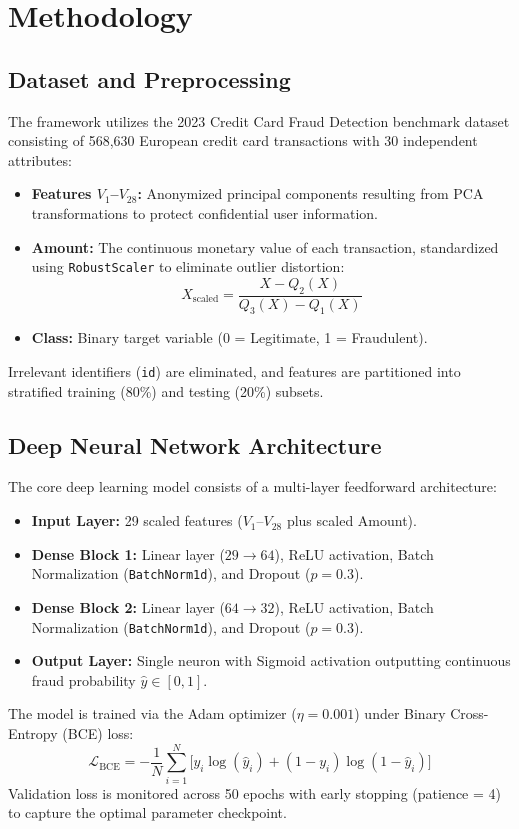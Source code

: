 \documentclass[conference]{IEEEtran}
\begin{document}
\section{Methodology}

\subsection{Dataset and Preprocessing}
The framework utilizes the 2023 Credit Card Fraud Detection benchmark dataset consisting of 568,630 European credit card transactions with 30 independent attributes:
\begin{itemize}
    \item \textbf{Features $V_1$--$V_{28}$:} Anonymized principal components resulting from PCA transformations to protect confidential user information.
    \item \textbf{Amount:} The continuous monetary value of each transaction, standardized using \texttt{RobustScaler} to eliminate outlier distortion:
    \begin{equation}
        X_{\text{scaled}} = \frac{X - Q_2(X)}{Q_3(X) - Q_1(X)}
    \end{equation}
    \item \textbf{Class:} Binary target variable (0 = Legitimate, 1 = Fraudulent).
\end{itemize}
Irrelevant identifiers (\texttt{id}) are eliminated, and features are partitioned into stratified training (80\%) and testing (20\%) subsets.

\subsection{Deep Neural Network Architecture}
The core deep learning model consists of a multi-layer feedforward architecture:
\begin{itemize}
    \item \textbf{Input Layer:} 29 scaled features ($V_1$--$V_{28}$ plus scaled Amount).
    \item \textbf{Dense Block 1:} Linear layer ($29 \rightarrow 64$), ReLU activation, Batch Normalization (\texttt{BatchNorm1d}), and Dropout ($p = 0.3$).
    \item \textbf{Dense Block 2:} Linear layer ($64 \rightarrow 32$), ReLU activation, Batch Normalization (\texttt{BatchNorm1d}), and Dropout ($p = 0.3$).
    \item \textbf{Output Layer:} Single neuron with Sigmoid activation outputting continuous fraud probability $\hat{y} \in [0, 1]$.
\end{itemize}
The model is trained via the Adam optimizer ($\eta = 0.001$) under Binary Cross-Entropy (BCE) loss:
\begin{equation}
    \mathcal{L}_{\text{BCE}} = -\frac{1}{N}\sum_{i=1}^{N} \Big[ y_i \log(\hat{y}_i) + (1 - y_i)\log(1 - \hat{y}_i) \Big]
\end{equation}
Validation loss is monitored across 50 epochs with early stopping (patience = 4) to capture the optimal parameter checkpoint.
\end{document}
